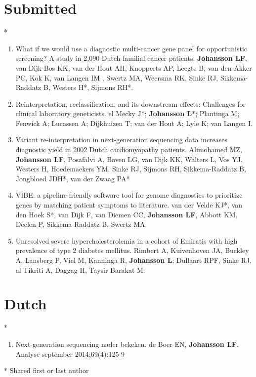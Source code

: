 \begin{appendices}
	\section{Submitted}*
	\begin{enumerate}
		\item What if we would use a diagnostic multi-cancer gene panel for opportunistic screening? A study in 2,090 Dutch familial cancer patients.  \textbf{Johansson LF}, van Dijk-Bos KK, van der Hout AH, Knopperts AP, Leegte B, van den Akker PC, Kok K, van Langen IM , Swertz MA, Weersma RK, Sinke RJ, Sikkema-Raddatz B, Westers H*,  Sijmons RH*.
		\item Reinterpretation, reclassification, and its downstream effects: Challenges for clinical laboratory geneticists. el Mecky J*; \textbf{Johansson L}*; Plantinga M; Fenwick A; Lucassen A; Dijkhuizen T; van der Hout A; Lyle K; van Langen I.
		\item Variant re-interpretation in next-generation sequencing data increases diagnostic yield in 2002 Dutch cardiomyopathy patients. Alimohamed MZ, \textbf{Johansson LF}, Posafalvi A, Boven LG, van Dijk KK, Walters L, Vos YJ, Westers H, Hoedemaekers YM, Sinke RJ, Sijmons RH, Sikkema-Raddatz B, Jongbloed JDH*, van der Zwaag PA*
		\item VIBE: a pipeline-friendly software tool for genome diagnostics to prioritize genes by matching patient symptoms to literature. van der Velde KJ*, van den Hoek S*, van Dijk F, van Diemen CC, \textbf{Johansson LF}, Abbott KM, Deelen P, Sikkema-Raddatz B, Swertz MA. 
		\item Unresolved severe hypercholesterolemia in a cohort of Emiratis with high prevalence of type 2 diabetes mellitus. Rimbert A, Kuivenhoven JA, Buckley A, Lansberg P, Viel M, Kanninga R, \textbf{Johansson L}; Dullaart RPF, Sinke RJ, al Tikriti A, Daggag H, Taysir Barakat M.
	\end{enumerate}
	
	\section{Dutch}*
	\begin{enumerate}
		\item Next-generation sequencing nader bekeken. de Boer EN, \textbf{Johansson LF}. Analyse september 2014;69(4):125-9 \\
	\end{enumerate}
	
	* Shared first or last author
	

\end{appendices}
